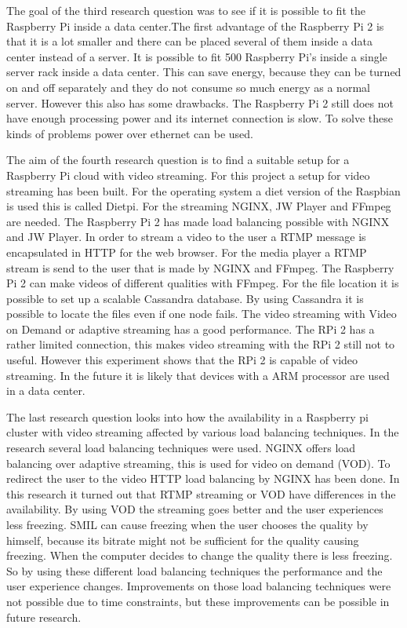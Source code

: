 \documentclass{sig-alternate-br}
\begin{document}
The goal of the third research question was to see if it is possible to fit the Raspberry Pi inside a data center.The first advantage of the Raspberry Pi 2 is that it is a lot smaller and there can be placed several of them inside a data center instead of a server. It is possible to fit 500 Raspberry Pi's inside a single server rack inside a data center. This can save energy, because they can be turned on and off separately and they do not consume so much energy as a normal server. However this also has some drawbacks. The Raspberry Pi 2 still does not have enough processing power and its internet connection is slow. To solve these kinds of problems power over ethernet can be used. 
	
The aim of the fourth research question is to find a suitable setup for a Raspberry Pi cloud with video streaming. For this project a setup for video streaming has been built. For the operating system a diet version of the Raspbian is used this is called Dietpi. For the streaming NGINX, JW Player and FFmpeg are needed. The Raspberry Pi 2 has made load balancing possible with NGINX and JW Player. In order to stream a video to the user a RTMP message is encapsulated in HTTP for the web browser.  For the media player a RTMP stream is send to the user that is made by NGINX and FFmpeg.
The Raspberry Pi 2 can make videos of different qualities with FFmpeg. For the file location it is possible to set up a scalable Cassandra database. By using Cassandra it is possible to locate the files even if one node fails.
The video streaming with Video on Demand or adaptive streaming has a good performance. The RPi 2 has a rather limited connection, this makes video streaming with the RPi 2 still not to useful. However this experiment shows that the RPi 2 is capable of video streaming. In the future it is likely that devices with a ARM processor are used in a data center. 

The last research question looks into how the availability in a Raspberry pi cluster with video streaming affected by various load balancing techniques. In the research several load balancing techniques were used. NGINX offers load balancing over adaptive streaming, this is used for video on demand (VOD). To redirect the user to the video HTTP load balancing by NGINX has been done. In this research it turned out that RTMP streaming or VOD have differences in the availability. By using VOD the streaming goes better and the user experiences less freezing. SMIL can cause freezing when the user chooses the quality by himself, because its bitrate might not be sufficient for the quality causing freezing. When the computer decides to change the quality there is less freezing. So by using these different load balancing techniques the performance and the user experience changes.  Improvements on those load balancing techniques were not possible due to time constraints, but these improvements can be possible in future research. 
\end{document}
